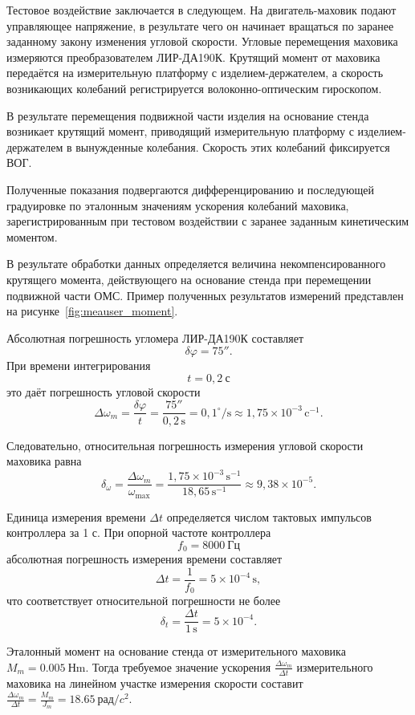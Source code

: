Тестовое воздействие заключается в следующем. На двигатель-маховик подают управляющее напряжение, в результате чего он начинает вращаться по заранее заданному закону изменения угловой скорости. Угловые перемещения маховика измеряются преобразователем ЛИР-ДА190К. Крутящий момент от маховика передаётся на измерительную платформу с изделием-держателем, а скорость возникающих колебаний регистрируется волоконно-оптическим гироскопом.

В результате перемещения подвижной части изделия на основание стенда возникает крутящий момент, приводящий измерительную платформу с изделием-держателем в вынужденные колебания. Скорость этих колебаний фиксируется ВОГ.

Полученные показания подвергаются дифференцированию и последующей градуировке по эталонным значениям ускорения колебаний маховика, зарегистрированным при тестовом воздействии с заранее заданным кинетическим моментом.

В результате обработки данных определяется величина некомпенсированного крутящего момента, действующего на основание стенда при перемещении подвижной части ОМС. Пример полученных результатов измерений представлен на рисунке~\cref{fig:meauser_moment}.


Абсолютная погрешность угломера ЛИР-ДА190К составляет
\[
\delta\varphi = 75''.
\]
При времени интегрирования
\[
t = 0{,}2\ \mathrm{с}
\]
это даёт погрешность угловой скорости
\[
\Delta\omega_m = \frac{\delta\varphi}{t}
= \frac{75''}{0,2\,\mathrm{s}}
= 0{,}1^\circ/\mathrm{s}
\approx 1{,}75\times10^{-3}\,\mathrm{c}^{-1}.
\]

Следовательно, относительная погрешность измерения угловой скорости маховика равна
\[
\delta_{\omega}
= \frac{\Delta \omega_m}{\omega_{\max}}
= \frac{1{,}75\times10^{-3}\,\mathrm{s}^{-1}}{18{,}65\,\mathrm{s}^{-1}}
\approx 9{,}38\times10^{-5}.
\]

Единица измерения времени \(\Delta t\) определяется числом тактовых импульсов контроллера за 1 с. При опорной частоте контроллера
\[
f_0 = 8000\ \mathrm{Гц}
\]
абсолютная погрешность измерения времени составляет
\[
\Delta t = \frac{1}{f_0} = 5\times10^{-4}\,\mathrm{s},
\]
что соответствует относительной погрешности не более
\[
\delta_t = \frac{\Delta t}{1\,\mathrm{s}} = 5\times10^{-4}.
\]

Эталонный момент на основание стенда от измерительного маховика $M_m=\SI{0,005}{Н\meter}$. Тогда требуемое значение ускорения $\frac{\Delta\omega_m}{\Delta t}$ измерительного маховика на линейном участке измерения скорости составит $\frac{\Delta\omega_m}{\Delta t} = \frac{M_m}{J_m}=\SI{18,65}{рад/c^2}$.

